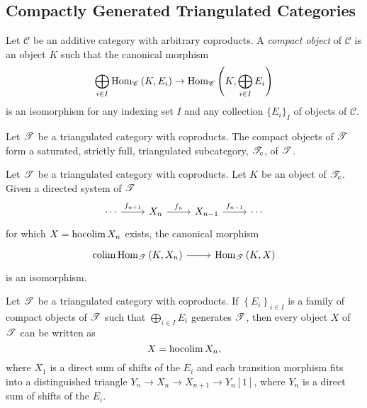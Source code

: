 \documentclass[dissertation.tex]{subfiles}
\begin{document}
\subsection{Compactly Generated Triangulated Categories}
\begin{defn}
  Let $\mathscr{C}$ be an additive category with arbitrary coproducts.
  A {\it compact object} of $\mathscr{C}$ is an object $K$ such that the canonical morphism
  $$\bigoplus_{i \in I} \operatorname{Hom}_{\mathscr{C}}\left(K, E_i\right) \rightarrow \operatorname{Hom}_{\mathscr{C}}\left(K, \bigoplus_{i \in I}E_i\right)$$
  is an isomorphism for any indexing set $I$ and any collection $\{E_i\}_I$ of objects of $\mathscr{C}$.
\end{defn}

\begin{lem}\label{compactobjstriangulated}
  Let $\mathscr{T}$ be a triangulated category with coproducts.
  The compact objects of $\mathscr{T}$ form a saturated, strictly full, triangulated subcategory, $\mathscr{T}_c$, of $\mathscr{T}$.
\end{lem}

\begin{lem}\label{homhocolimiscolim}
  Let $\mathscr{T}$ be a triangulated category with coproducts.
  Let $K$ be an object of $\mathscr{T}_c$.
  Given a directed system of $\mathscr{T}$
  $$\begin{tikzcd}
    \cdots \arrow{r}{f_{n+1}} & X_n \arrow{r}{f_n} & X_{n-1} \arrow{r}{f_{n-1}} & \cdots
  \end{tikzcd}$$
  for which $X = \operatorname{hocolim}X_n$ exists, the canonical morphism
  $$\begin{tikzcd}
    \op{colim} \Hom{\T}{K,X_n} \arrow{r} & \Hom{\T}{K,X}
  \end{tikzcd}$$
  is an isomorphism.
\end{lem}

\begin{lem}\label{hocolim}
  Let $\mathscr{T}$ be a triangulated category with coproducts.
  If $\left\{E_i\right\}_{i \in I}$ is a family of compact objects of $\mathscr{T}$ such that $\bigoplus_{i \in I}{E_i}$ generates $\mathscr{T}$, then every object $X$ of $\mathscr{T}$ can be written as 
  $$X = \operatorname{hocolim}X_n,$$
  where $X_1$ is a direct sum of shifts of the $E_i$ and each transition morphism fits into a distinguished triangle $Y_n \rightarrow X_n \rightarrow X_{n+1} \rightarrow Y_n[1]$, where $Y_n$ is a direct sum of shifts of the $E_i$.
\end{lem}
\end{document}
